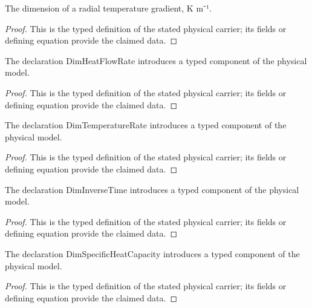 \begin{definition}
  \label{def:physics:IPhO_2026_4_C_6:aux011}
  The dimension of a radial temperature gradient, K m⁻¹.
\end{definition}
\begin{proof}
  This is the typed definition of the stated physical carrier; its fields or defining equation provide the claimed data.
\end{proof}

\begin{definition}
  \label{def:physics:IPhO_2026_4_C_6:aux012}
  The declaration DimHeatFlowRate introduces a typed component of the physical model.
\end{definition}
\begin{proof}
  This is the typed definition of the stated physical carrier; its fields or defining equation provide the claimed data.
\end{proof}

\begin{definition}
  \label{def:physics:IPhO_2026_4_C_6:aux013}
  The declaration DimTemperatureRate introduces a typed component of the physical model.
\end{definition}
\begin{proof}
  This is the typed definition of the stated physical carrier; its fields or defining equation provide the claimed data.
\end{proof}

\begin{definition}
  \label{def:physics:IPhO_2026_4_C_6:aux014}
  The declaration DimInverseTime introduces a typed component of the physical model.
\end{definition}
\begin{proof}
  This is the typed definition of the stated physical carrier; its fields or defining equation provide the claimed data.
\end{proof}

\begin{definition}
  \label{def:physics:IPhO_2026_4_C_6:aux015}
  The declaration DimSpecificHeatCapacity introduces a typed component of the physical model.
\end{definition}
\begin{proof}
  This is the typed definition of the stated physical carrier; its fields or defining equation provide the claimed data.
\end{proof}

